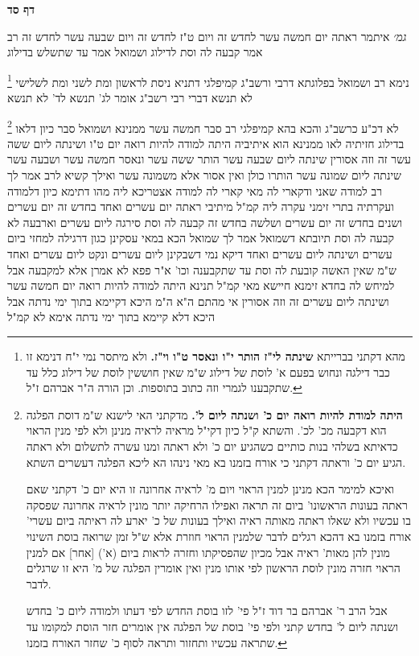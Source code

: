 \documentclass[12pt, openany]{book}
\newcommand{\sethebfont}{
\fontsize{10.5pt}{21.0pt} \selectfont
}
\newcommand{\twocol}[1]{
	{\sethebfont \begin{multicols}{2}
			#1
	\end{multicols}}	
}
\newcommand{\sectname}{}
\newcommand{\newsection}[1]{
	\addcontentsline{toc}{section}{#1}
	\renewcommand{\sectname}{#1}	
	\vspace{-\baselineskip}
	\begin{center}
		\textbf{%
\fontsize{16pt}{16pt}\selectfont
			#1}
	\end{center}
	\vspace{-\baselineskip}
	\nopagebreak
}
\newcommand{\footnotecomment}[1]{
	\renewcommand\thefootnote{}
	\footnote{#1}}
\newcommand{\commenta}[1]{\footnotecomment{#1}}
\begin{document}
\newsection{דף סד}
\twocol{{\large\emph{גמ׳}} איתמר ראתה יום חמשה עשר לחדש זה ויום ט"ז לחדש זה ויום שבעה עשר לחדש זה רב אמר קבעה לה וסת לדילוג ושמואל אמר עד שתשלש בדילוג 
\commenta{מהא דקתני בברייתא \textbf{שינתה לי"ז הותר י"ו ונאסר ט"ו וי"ז.} ולא מיתסר נמי י"ח דנימא זו כבר דילגה ונחוש בפעם א' לוסת של דילוג ש"מ שאין חוששין לוסת של דילוג כלל עד שתקבענו לגמרי וזה כתוב בתוספות. וכן הורה ה"ר אברהם ז"ל. }
נימא רב ושמואל בפלוגתא דרבי ורשב"ג קמיפלגי דתניא ניסת לראשון ומת לשני ומת לשלישי לא תנשא דברי רבי רשב"ג אומר לג' תנשא לד' לא תנשא 
\commenta{\textbf{היתה למודת להיות רואה יום כ' ושנתה ליום ל'.} מדקתני האי לישנא ש"מ דוסת הפלגה הוא דקבעה מכ' לכ'. והשתא ק"ל כיון דקי"ל מראיה לראיה מנינן ולא לפי מנין הראוי כדאיתא בשלהי בנות כותיים כשהגיע יום כ' ולא ראתה ומנו עשרה לתשלום ולא ראתה הגיע יום כ' וראתה דקתני כי אורח בזמנו בא מאי נינהו הא ליכא הפלגה דעשרים השתא.\par ואיכא למימר הכא מנינן למנין הראוי ויום מ' לראיה אחרונה זו היא יום כ' דקתני שאם ראתה בעונות הראשונו' ביום זה תראה ואפילו הרחיקה יותר מונין לראיה אחרונה שפסקה בו עכשיו ולא שאלו ראתה מאותה ראיה ואילך בעונות של כ' יארע לה ראיתה ביום עשרי' אורח בזמנו בא דהכא רגלים לדבר שלמנין הראוי חוזרת אלא ש"ל זמן שרואה בוסת השינוי מונין להן מאות' ראיה אבל מכיון שהפסיקתו וחזרה לראות ביום (א') [אחר] אם למנין הראוי חזרה מונין לוסת הראשון לפי אותו מנין ואין אומרין הפלגה של מ' היא זו שרגלים לדבר.\par אבל הרב ר' אברהם בר דוד ז"ל פי' לזו בוסת החדש לפי דעתו ולמודה ליום כ' בחדש ושנתה ליום ל' בחדש קתני ולפי פי' בוסת של הפלגה אין אומרים חזר הוסת למקומו עד שתראה עכשיו ותחזור ותראה לסוף כ' שחזר האורח בזמנו. }
לא דכ"ע כרשב"ג והכא בהא קמיפלגי רב סבר חמשה עשר ממנינא ושמואל סבר כיון דלאו בדילוג חזיתיה לאו ממנינא הוא 
איתיביה היתה למודה להיות רואה יום ט"ו ושינתה ליום ששה עשר זה וזה אסורין שינתה ליום שבעה עשר הותר ששה עשר ונאסר חמשה עשר ושבעה עשר 
שינתה ליום שמונה עשר הותרו כולן ואין אסור אלא משמונה עשר ואילך קשיא לרב אמר לך רב למודה שאני 
ודקארי לה מאי קארי לה למודה אצטריכא ליה מהו דתימא כיון דלמודה ועקרתיה בתרי זימני עקרה ליה קמ"ל 
מיתיבי ראתה יום עשרים ואחד בחדש זה יום עשרים ושנים בחדש זה יום עשרים ושלשה בחדש זה קבעה לה וסת סירגה ליום עשרים וארבעה לא קבעה לה וסת תיובתא דשמואל 
אמר לך שמואל הכא במאי עסקינן כגון דרגילה למחזי ביום עשרים ושינתה ליום עשרים ואחד דיקא נמי דשבקינן ליום עשרים ונקט ליום עשרים ואחד ש"מ
שאין האשה קובעת לה וסת עד שתקבענה וכו' א"ר פפא לא אמרן אלא למקבעה אבל למיחש לה בחדא זימנא חיישא 
מאי קמ"ל תנינא היתה למודה להיות רואה יום חמשה עשר ושינתה ליום עשרים זה וזה אסורין 
אי מהתם ה"א ה"מ היכא דקיימא בתוך ימי נדתה אבל היכא דלא קיימא בתוך ימי נדתה אימא לא קמ"ל
}
\end{document}
